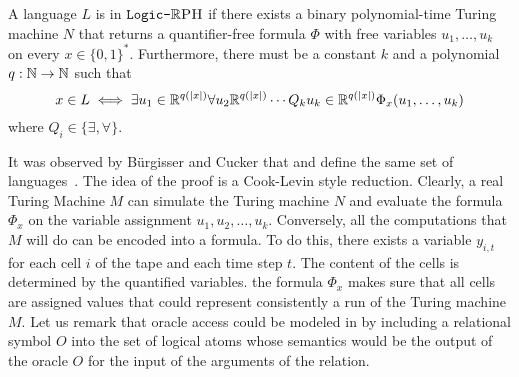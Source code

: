\documentclass{article}
\begin{document}
\begin{definition}[\LogicRPH]
\label{def:LogicRPH}
A language $L$ is in $\texttt{Logic-}\mathbb{R}\textsc{PH}$ if there exists a binary polynomial-time Turing machine $N$ that returns a quantifier-free formula $\Phi$ with free variables \(u_1, \dotsc, u_k\) on every $x \in \{0,1\}^{*}$.
Furthermore, there must be a constant $k$ and a polynomial $q:\mathbb{N} \rightarrow \mathbb{N}$
such that
\begin{equation*}
    x \in L \iff \exists u_1 \in \mathbb{R}^{q(|x|)} \forall u_2 \mathbb{R}^{q(|x|)} \cdots Q_k u_k \in \mathbb{R}^{q(|x|)} \Phi_x(u_1,\ldots,u_k)
\end{equation*}
where $Q_i \in \{\exists,\forall\}$.
\end{definition}

It was observed by B\"{u}rgisser and Cucker that \LogicRPH and \RPH define the same set of languages~\cite{BC09}.
The idea of the proof is a Cook-Levin style reduction.
Clearly, a real Turing Machine $M$ can simulate the Turing machine $N$ and evaluate the formula $\Phi_x$ on the variable assignment $u_1,u_2,\ldots , u_k$.
Conversely, all the computations that $M$ will do can be encoded into a formula. 
To do this, there exists a variable $y_{i,t}$ for each cell $i$ of the tape and each time step $t$. 
The content of the cells is determined by 
the quantified variables.
the formula $\Phi_x$ makes sure that all cells are assigned values that could represent consistently a run of the Turing machine $M$. Let us remark that oracle access could be modeled in \LogicRPH by including a relational symbol \(O\) into the set of logical atoms whose semantics would be the output of the oracle \(O\) for the input of the arguments of the relation.
\end{document}
